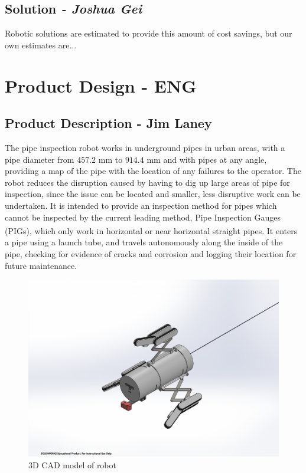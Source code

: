 \documentclass[11pt]{article}		%
\newlength{\imageheight}	 %
\newcommand{\supercite}[1]{\textsuperscript{\cite{#1}}}		%
\begin{document}
	\subsection{Solution \textit{- Joshua Gei}}
	
	Robotic solutions are estimated to provide this amount of cost savings, but our own estimates are... 
	
	\section{Product Design - ENG}
	
	\subsection[Product Description]{Product Description - Jim Laney}
	
		The pipe inspection robot works in underground pipes in urban areas, with a pipe diameter from $457.2$ mm to $914.4$ mm and with pipes at any angle, providing a map of the pipe with the location of any failures to the operator. %
		The robot reduces the disruption caused by having to dig up large areas of pipe for inspection, since the issue can be located and smaller, less disruptive work can be undertaken.
		It is intended to provide an inspection method for pipes which cannot be inspected by the current leading method, Pipe Inspection Gauges (PIGs), which only work in horizontal or near horizontal straight pipes\supercite{mills2017advances}.
		It enters a pipe using a launch tube, and travels autonomously along the inside of the pipe, checking for evidence of cracks and corrosion and logging their location for future maintenance.
		\\
		
		\begin{figure}[h] %
			\centering
			\includegraphics[trim={6cm 2cm 7cm 4cm},clip,height=\imageheight]{overviewCAD}
			\caption{3D CAD model of robot}
			\label{3DSketch}
		\end{figure}
		
\end{document}
